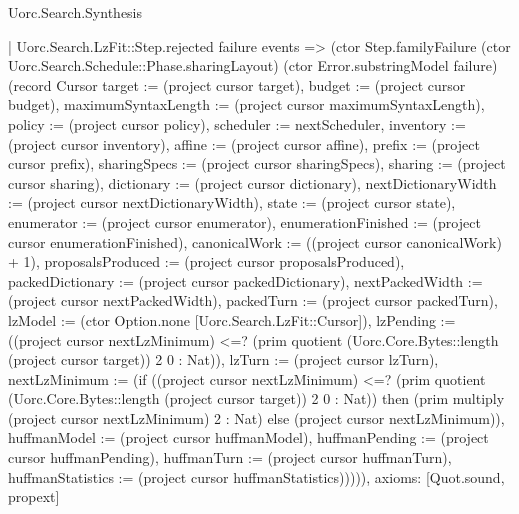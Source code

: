 \begin{lexlean}{Uorc.Search.Synthesis}
\begin{semanticmodule}
{      | Uorc.Search.LzFit::Step.rejected failure events => (ctor Step.familyFailure (ctor Uorc.Search.Schedule::Phase.sharingLayout) (ctor Error.substringModel failure) (record Cursor {target := (project cursor target), budget := (project cursor budget), maximumSyntaxLength := (project cursor maximumSyntaxLength), policy := (project cursor policy), scheduler := nextScheduler, inventory := (project cursor inventory), affine := (project cursor affine), prefix := (project cursor prefix), sharingSpecs := (project cursor sharingSpecs), sharing := (project cursor sharing), dictionary := (project cursor dictionary), nextDictionaryWidth := (project cursor nextDictionaryWidth), state := (project cursor state), enumerator := (project cursor enumerator), enumerationFinished := (project cursor enumerationFinished), canonicalWork := ((project cursor canonicalWork) + 1), proposalsProduced := (project cursor proposalsProduced), packedDictionary := (project cursor packedDictionary), nextPackedWidth := (project cursor nextPackedWidth), packedTurn := (project cursor packedTurn), lzModel := (ctor Option.none [Uorc.Search.LzFit::Cursor]), lzPending := ((project cursor nextLzMinimum) <=? (prim quotient (Uorc.Core.Bytes::length (project cursor target)) 2 0 : Nat)), lzTurn := (project cursor lzTurn), nextLzMinimum := (if ((project cursor nextLzMinimum) <=? (prim quotient (Uorc.Core.Bytes::length (project cursor target)) 2 0 : Nat)) then (prim multiply (project cursor nextLzMinimum) 2 : Nat) else (project cursor nextLzMinimum)), huffmanModel := (project cursor huffmanModel), huffmanPending := (project cursor huffmanPending), huffmanTurn := (project cursor huffmanTurn), huffmanStatistics := (project cursor huffmanStatistics)})))),
  axioms: [Quot.sound, propext]
}


\end{semanticmodule}
\end{lexlean}
